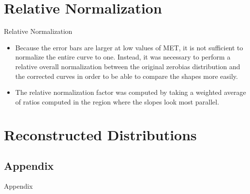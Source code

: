 \documentclass[]{beamer}
\begin{document}
\section{Relative Normalization}
\begin{frame}{Relative Normalization}
		\begin{itemize}
				\item Because the error bars are larger at low values of MET, it is not sufficient to normalize the entire curve to one. Instead, it was necessary to perform a relative overall normalization between the original zerobias distribution and the corrected curves in order to be able to compare the shapes more easily.
				\item The relative normalization factor was computed by taking a weighted average of ratios computed in the region where the slopes look most parallel.
		\end{itemize}
\end{frame}
\section{Reconstructed Distributions}
\begin{frame}
\end{frame}

\begin{frame}
\end{frame}
\begin{frame}
\end{frame}
\begin{frame}
\end{frame}
\begin{frame}
\end{frame}
\begin{frame}
\end{frame}
\begin{frame}
\end{frame}
\begin{frame}
\end{frame}
\begin{frame}
\section{Appendix}
\LARGE{Appendix}
\end{frame}
\end{document}
